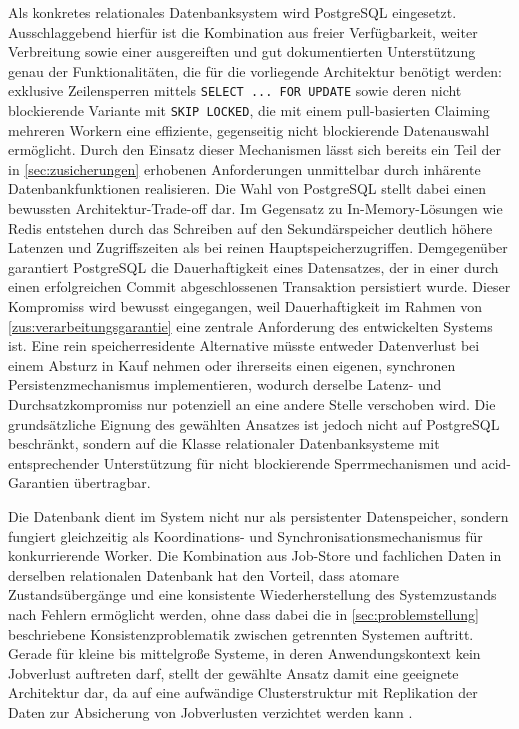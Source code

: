 Als konkretes relationales Datenbanksystem wird PostgreSQL eingesetzt.
Ausschlaggebend hierfür ist die Kombination aus freier Verfügbarkeit, weiter Verbreitung sowie einer ausgereiften und
gut dokumentierten Unterstützung genau der Funktionalitäten, die für die vorliegende Architektur benötigt werden: exklusive
Zeilensperren mittels \texttt{SELECT ... FOR UPDATE} sowie deren nicht blockierende Variante mit \texttt{SKIP LOCKED},
die mit einem pull-basierten Claiming mehreren Workern eine effiziente, gegenseitig nicht blockierende Datenauswahl ermöglicht.
Durch den Einsatz dieser Mechanismen lässt sich bereits ein Teil der in \cref{sec:zusicherungen} erhobenen Anforderungen unmittelbar
durch inhärente Datenbankfunktionen realisieren.
Die Wahl von PostgreSQL stellt dabei einen bewussten Architektur-Trade-off dar.
Im Gegensatz zu In-Memory-Lösungen wie Redis entstehen durch das Schreiben auf den
Sekundärspeicher deutlich höhere Latenzen und Zugriffszeiten als bei reinen Hauptspeicherzugriffen.
Demgegenüber garantiert PostgreSQL die Dauerhaftigkeit eines Datensatzes, der in einer durch einen erfolgreichen Commit
abgeschlossenen Transaktion persistiert wurde.
Dieser Kompromiss wird bewusst eingegangen, weil Dauerhaftigkeit im Rahmen von \ref{zus:verarbeitungsgarantie} eine
zentrale Anforderung des entwickelten Systems ist.
Eine rein speicherresidente Alternative müsste entweder Datenverlust bei einem Absturz in Kauf nehmen oder ihrerseits einen
eigenen, synchronen Persistenzmechanismus implementieren, wodurch derselbe Latenz- und Durchsatzkompromiss nur potenziell
an eine andere Stelle verschoben wird.
Die grundsätzliche Eignung des gewählten Ansatzes ist jedoch nicht auf PostgreSQL beschränkt, sondern auf die Klasse
relationaler Datenbanksysteme mit entsprechender Unterstützung für nicht blockierende Sperrmechanismen und \gls{acid}-Garantien übertragbar.

Die Datenbank dient im System nicht nur als persistenter Datenspeicher, sondern fungiert gleichzeitig als Koordinations-
und Synchronisationsmechanismus für konkurrierende Worker.
Die Kombination aus Job-Store und fachlichen Daten in derselben relationalen Datenbank hat den Vorteil, dass
atomare Zustandsübergänge und eine konsistente Wiederherstellung des Systemzustands nach Fehlern ermöglicht werden,
ohne dass dabei die in \cref{sec:problemstellung} beschriebene Konsistenzproblematik zwischen getrennten Systemen auftritt.
Gerade für kleine bis mittelgroße Systeme, in deren Anwendungskontext kein Jobverlust auftreten darf, stellt der gewählte
Ansatz damit eine geeignete Architektur dar, da auf eine aufwändige Clusterstruktur mit Replikation der Daten zur Absicherung von
Jobverlusten verzichtet werden kann \parencite[Kap.~8 Abschnitt \glqq How Brokers Work (In A Nutshell)\grqq]{newman_building_2026}.

